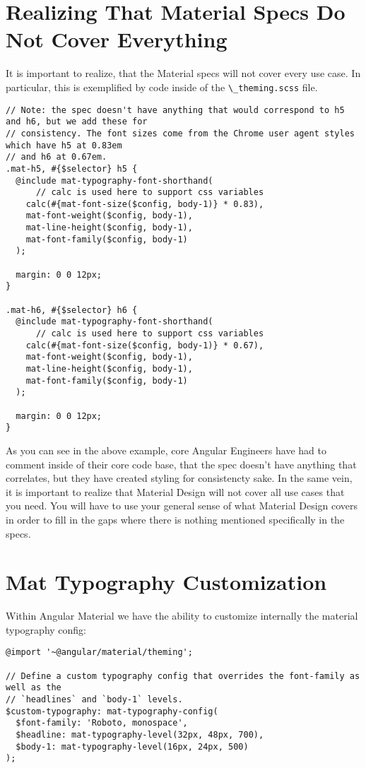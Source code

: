 \section{Realizing That Material Specs Do Not Cover Everything}
It is important to realize, that the Material specs will not cover
every use case. In particular, this is exemplified by code inside of 
the \lstinline{\_theming.scss} file. 

\begin{lstlisting}
// Note: the spec doesn't have anything that would correspond to h5 and h6, but we add these for
// consistency. The font sizes come from the Chrome user agent styles which have h5 at 0.83em
// and h6 at 0.67em.
.mat-h5, #{$selector} h5 {
  @include mat-typography-font-shorthand(
      // calc is used here to support css variables
    calc(#{mat-font-size($config, body-1)} * 0.83),
    mat-font-weight($config, body-1),
    mat-line-height($config, body-1),
    mat-font-family($config, body-1)
  );

  margin: 0 0 12px;
}

.mat-h6, #{$selector} h6 {
  @include mat-typography-font-shorthand(
      // calc is used here to support css variables
    calc(#{mat-font-size($config, body-1)} * 0.67),
    mat-font-weight($config, body-1),
    mat-line-height($config, body-1),
    mat-font-family($config, body-1)
  );

  margin: 0 0 12px;
}
\end{lstlisting}

As you can see in the above example, core Angular Engineers have had to comment 
inside of their core code base, that the spec doesn't have anything that 
correlates, but they have created styling for consistencty sake. In the same vein,
it is important to realize that Material Design will not cover all use cases 
that you need. You will have to use your general sense of what Material Design 
covers in order to fill in the gaps where there is nothing mentioned specifically 
in the specs. 

\section{Mat Typography Customization}
Within Angular Material we have the ability to customize internally the 
material typography config: 

\begin{lstlisting}
@import '~@angular/material/theming';

// Define a custom typography config that overrides the font-family as well as the
// `headlines` and `body-1` levels.
$custom-typography: mat-typography-config(
  $font-family: 'Roboto, monospace',
  $headline: mat-typography-level(32px, 48px, 700),
  $body-1: mat-typography-level(16px, 24px, 500)
);
\end{lstlisting}


